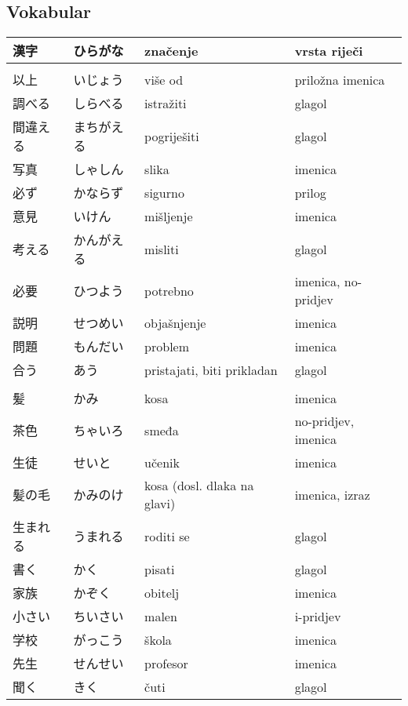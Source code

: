 \documentclass[a5paper,10pt]{tekst}
\begin{document}
	\subsection*{Vokabular}
	\renewcommand{\arraystretch}{1.333}
	\begin{xltabular}{\linewidth}{>{\normalsize}l>{\normalsize}l>{\raggedright\arraybackslash}l>{\raggedright\arraybackslash}X}
			\toprule
			\textbf{漢字} & \textbf{ひらがな} & \textbf{značenje} & \textbf{vrsta riječi} \\ \midrule
			\endhead
			 \\ \midrule
			以上　 & いじょう & više od & priložna imenica \\ 
			調べる & しらべる & istražiti & glagol  \\ 
			間違える & まちがえる & pogriješiti & glagol \\ 
			写真 & しゃしん & slika & imenica \\ 
			必ず & かならず & sigurno & prilog \\ 
			意見 & いけん & mišljenje & imenica \\ 
			考える & かんがえる & misliti & glagol \\ 
			必要 & ひつよう & potrebno & imenica, no-pridjev \\ 
			説明 & せつめい & objašnjenje & imenica \\ 
			問題 & もんだい & problem & imenica \\ 
			合う & あう & pristajati, biti prikladan & glagol \\ \midrule
			  \\ \midrule
			髪 & かみ & kosa & imenica \\ 
			茶色　 & ちゃいろ & smeđa & no-pridjev, imenica \\ 
			生徒 & せいと & učenik & imenica \\ 
			髪の毛 & かみのけ & kosa (dosl. dlaka na glavi) & imenica, izraz \\ 
			生まれる & うまれる & roditi se & glagol \\ 
			書く & かく & pisati & glagol \\ 
			家族 & かぞく & obitelj & imenica \\ 
			小さい & ちいさい & malen & i-pridjev \\ 
			学校 & がっこう & škola & imenica \\ 
			先生 & せんせい & profesor & imenica \\ 
			聞く & きく & čuti & glagol \\ 

\end{xltabular}
\end{document}
